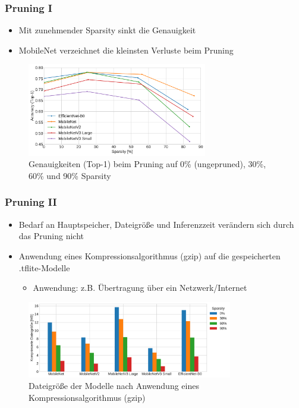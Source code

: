 \documentclass{beamer}
\begin{document}
\begin{frame}
\frametitle{Pruning I}

\begin{itemize}
	\item Mit zunehmender Sparsity sinkt die Genauigkeit
	\item MobileNet verzeichnet die kleinsten Verluste beim Pruning
\end{itemize}

\begin{figure}
\includegraphics[width=0.7\textwidth]{img/sparsity_vs_accuracy.pdf}
\caption{Genauigkeiten (Top-1) beim Pruning auf 0\% (ungepruned), 30\%, 60\% und 90\% Sparsity}
\end{figure}

\end{frame}


\begin{frame}
\frametitle{Pruning II}

\begin{itemize}
	\item Bedarf an Hauptspeicher, Dateigröße und Inferenzzeit verändern sich durch das Pruning nicht
	\item Anwendung eines Kompressionsalgorithmus (gzip) auf die gespeicherten .tflite-Modelle
	\begin{itemize}
		\item Anwendung: z.B. Übertragung über ein Netzwerk/Internet
	\end{itemize}
\end{itemize}

\begin{figure}
\includegraphics[width=0.8\textwidth]{img/pruned_and_compressed.pdf}
\caption{Dateigröße der Modelle nach Anwendung eines Kompressionsalgorithmus (gzip)}
\end{figure}

\end{frame}
\end{document}
